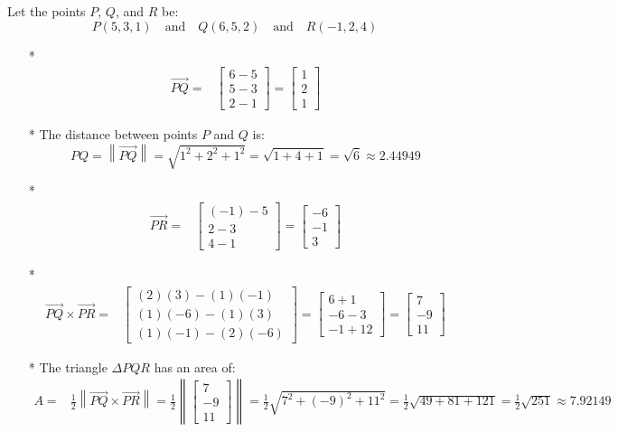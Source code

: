 \documentclass{article}
\begin{document}
Let the points \(P\), \(Q\), and \(R\) be:
\[P(5, 3, 1) \quad\text{and}\quad Q(6, 5, 2) \quad\text{and}\quad R(-1, 2, 4)\]
\begin{itemize}
\item[*] \begin{align*}
\overrightarrow{PQ} = & \begin{bmatrix} 6 - 5 \\ 5 - 3 \\ 2 - 1 \end{bmatrix} = \begin{bmatrix} 1 \\ 2 \\ 1 \end{bmatrix}
\end{align*}
\item[*] The distance between points \(P\) and \(Q\) is: 
\[PQ = \left\|\overrightarrow{PQ}\right\| = \sqrt{1^2 + 2^2 + 1^2} = \sqrt{1 + 4 + 1} = \sqrt{6} \approx 2.44949\]
\item[*] \begin{align*}
\overrightarrow{PR} = & \begin{bmatrix} (-1) - 5 \\ 2 - 3 \\ 4 - 1 \end{bmatrix} = \begin{bmatrix} -6 \\ -1 \\ 3 \end{bmatrix}
\end{align*}
\item[*] \begin{align*}
\overrightarrow{PQ} \times \overrightarrow{PR} = & \begin{bmatrix} (2)(3) - (1)(-1) \\ (1)(-6) - (1)(3) \\ (1)(-1) - (2)(-6) \end{bmatrix} = \begin{bmatrix} 6 + 1 \\ -6 - 3 \\ -1 + 12 \end{bmatrix} = \begin{bmatrix} 7 \\ -9 \\ 11 \end{bmatrix}
\end{align*}
\item[*] The triangle \(\Delta PQR\) has an area of:   
\begin{align*}
A = & \frac{1}{2}\left\|\overrightarrow{PQ} \times \overrightarrow{PR}\right\|  
= \frac{1}{2}\left\|\begin{bmatrix} 7 \\ -9 \\ 11 \end{bmatrix} \right\| 
= \frac{1}{2}\sqrt{7^2 + (-9)^2 + 11^2} 
= \frac{1}{2}\sqrt{49 + 81 + 121} = \frac{1}{2}\sqrt{251} \approx 7.92149
\end{align*}
\end{itemize}
\end{document}
